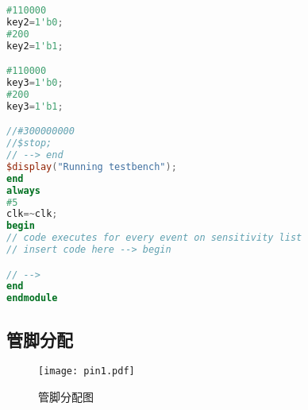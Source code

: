 \documentclass[12pt,AutoFakeBold]{article}
\begin{document}
\begin{lstlisting}[language=Verilog]
#110000
key2=1'b0;
#200
key2=1'b1;

#110000
key3=1'b0;
#200
key3=1'b1;

//#300000000
//$stop;                                                
// --> end                                             
$display("Running testbench");                       
end                                                    
always   
#5
clk=~clk;                
begin                                                  
// code executes for every event on sensitivity list   
// insert code here --> begin                          

// --> 
end                                               
endmodule
\end{lstlisting}



\newpage

\begin{appendices}  %

\section{管脚分配}

\begin{figure}[hbtp]
	\centering
	\texttt{[image: pin1.pdf]}
	\caption{管脚分配图}\label{fig:pin1}
\end{figure}

\end{appendices}
\end{document}
